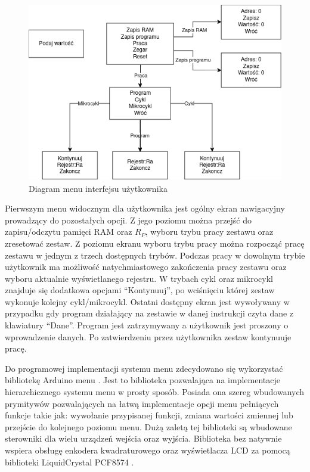 \documentclass[../main.tex]{subfiles}
\begin{document}
    \begin{figure}[H]
        \centering
        \includegraphics[scale=0.6]{menu_diagram.png}
        \caption{Diagram menu interfejsu użytkownika}
        \label{fig:menu_diagram}
    \end{figure}

    Pierwszym menu widocznym dla użytkownika jest ogólny ekran nawigacyjny prowadzący do pozostałych opcji. Z jego poziomu można przejść
    do zapisu/odczytu pamięci RAM oraz $R_P$, wyboru trybu pracy zestawu oraz zresetować zestaw. Z poziomu ekranu wyboru trybu pracy można 
    rozpocząć pracę zestawu w jednym z trzech dostępnych trybów. Podczas pracy w dowolnym trybie użytkownik ma możliwość natychmiastowego 
    zakończenia pracy zestawu oraz wyboru aktualnie wyświetlanego rejestru. W trybach cykl oraz mikrocykl znajduje się dodatkowa opcjami
    ``Kontynuuj'', po wciśnięciu której zestaw wykonuje kolejny cykl/mikrocykl. Ostatni dostępny ekran jest wywoływany w przypadku
    gdy program działający na zestawie w danej instrukcji czyta dane z klawiatury ``Dane''. Program jest zatrzymywany a użytkownik jest proszony
    o wprowadzenie danych. Po zatwierdzeniu przez użytkownika zestaw kontynuuje pracę.
    \par
    Do programowej implementacji systemu menu zdecydowano się wykorzystać bibliotekę Arduino menu \cite{arduino_menu}. Jest to biblioteka
    pozwalająca na implementacje hierarchicznego systemu menu w prosty sposób. Posiada ona szereg wbudowanych prymitywów pozwalających
    na łatwą implementacje opcji menu pełniących funkcje takie jak: wywołanie przypisanej funkcji, zmiana wartości zmiennej lub przejście
    do kolejnego poziomu menu. Dużą zaletą tej biblioteki są wbudowane sterowniki dla wielu urządzeń wejścia oraz wyjścia. Biblioteka 
    bez natywnie wspiera obsługę enkodera kwadraturowego oraz wyświetlacza LCD za pomocą biblioteki LiquidCrystal PCF8574 \cite{lcd_pcf8574}.
\end{document}
